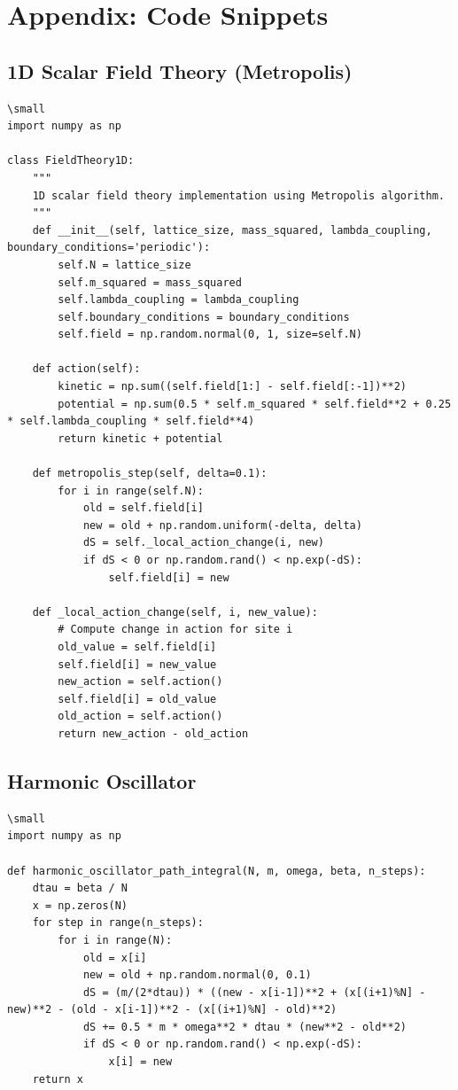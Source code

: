 \documentclass[12pt]{article}
\begin{document}
\appendix
\section{Appendix: Code Snippets}
\subsection{1D Scalar Field Theory (Metropolis)}
\begin{verbatim}
\small
import numpy as np

class FieldTheory1D:
    """
    1D scalar field theory implementation using Metropolis algorithm.
    """
    def __init__(self, lattice_size, mass_squared, lambda_coupling, boundary_conditions='periodic'):
        self.N = lattice_size
        self.m_squared = mass_squared
        self.lambda_coupling = lambda_coupling
        self.boundary_conditions = boundary_conditions
        self.field = np.random.normal(0, 1, size=self.N)

    def action(self):
        kinetic = np.sum((self.field[1:] - self.field[:-1])**2)
        potential = np.sum(0.5 * self.m_squared * self.field**2 + 0.25 * self.lambda_coupling * self.field**4)
        return kinetic + potential

    def metropolis_step(self, delta=0.1):
        for i in range(self.N):
            old = self.field[i]
            new = old + np.random.uniform(-delta, delta)
            dS = self._local_action_change(i, new)
            if dS < 0 or np.random.rand() < np.exp(-dS):
                self.field[i] = new

    def _local_action_change(self, i, new_value):
        # Compute change in action for site i
        old_value = self.field[i]
        self.field[i] = new_value
        new_action = self.action()
        self.field[i] = old_value
        old_action = self.action()
        return new_action - old_action
\end{verbatim}

\subsection{Harmonic Oscillator}
\begin{verbatim}
\small
import numpy as np

def harmonic_oscillator_path_integral(N, m, omega, beta, n_steps):
    dtau = beta / N
    x = np.zeros(N)
    for step in range(n_steps):
        for i in range(N):
            old = x[i]
            new = old + np.random.normal(0, 0.1)
            dS = (m/(2*dtau)) * ((new - x[i-1])**2 + (x[(i+1)%N] - new)**2 - (old - x[i-1])**2 - (x[(i+1)%N] - old)**2)
            dS += 0.5 * m * omega**2 * dtau * (new**2 - old**2)
            if dS < 0 or np.random.rand() < np.exp(-dS):
                x[i] = new
    return x
\end{verbatim}
\end{document}
